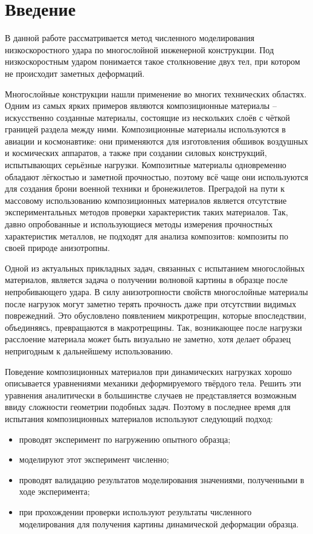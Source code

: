 \section*{Введение}
В данной работе рассматривается метод численного моделирования низкоскоростного удара по многослойной инженерной конструкции. Под низкоскоростным ударом понимается такое столкновение двух тел, при котором не происходит заметных деформаций. 

Многослойные конструкции нашли применение во многих технических областях. Одним из самых ярких примеров являются композиционные материалы -- искусственно созданные  материалы, состоящие из нескольких слоёв с чёткой границей раздела между ними. Композиционные материалы используются в авиации и космонавтике: они применяются для изготовления обшивок воздушных и космических аппаратов, а также при создании силовых конструкций, испытывающих серьёзные нагрузки. Композитные материалы одновременно обладают лёгкостью и заметной прочностью, поэтому всё чаще они используются для создания брони военной техники и бронежилетов. Преградой на пути к массовому использованию композиционных материалов является отсутствие экспериментальных методов проверки характеристик таких материалов. Так, давно опробованные и использующиеся методы измерения прочностн\'{ы}х характеристик металлов, не подходят для анализа композитов: композиты по своей природе анизотропны.

Одной из актуальных прикладных задач, связанных с испытанием многослойных материалов, является задача о получении волновой картины в образце после непробивающего удара. В силу анизотропности свойств многослойные материалы после нагрузок могут заметно терять прочность даже при отсутствии видимых поврежедний. Это обусловлено появлением микротрещин, которые впоследствии, объединяясь, превращаются в макротрещины. Так, возникающее после нагрузки расслоение материала может быть визуально не заметно, хотя делает образец непригодным к дальнейшему использованию.

Поведение композиционных материалов при динамических нагрузках хорошо описывается уравнениями механики деформируемого твёрдого тела. Решить эти уравнения аналитически в большинстве случаев не представляется возможным ввиду сложности геометрии подобных задач. Поэтому в последнее время для испытания композиционных материалов используют следующий подход:
\begin{itemize}
\item проводят эксперимент по нагружению опытного образца;
\item моделируют этот эксперимент численно;
\item проводят валидацию результатов моделирования значениями, полученными в ходе эксперимента;
\item при прохождении проверки используют результаты численного моделирования для получения картины динамической деформации образца.
\end{itemize}

